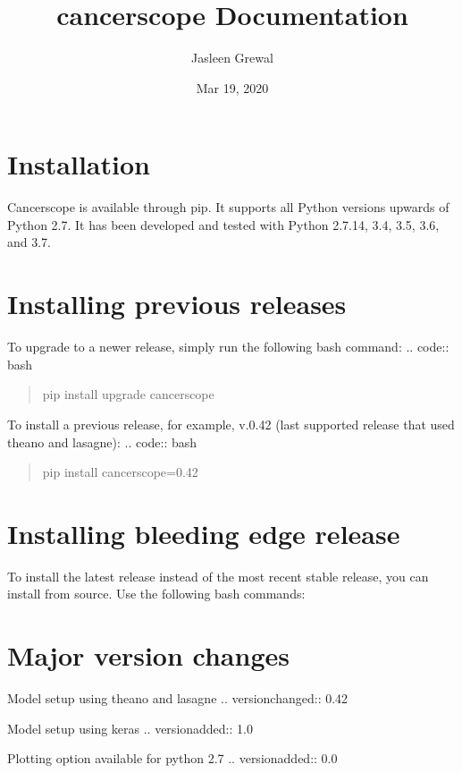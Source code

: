 \documentclass[letterpaper,10pt,english]{sphinxmanual}
\title{cancerscope Documentation}
\date{Mar 19, 2020}
\author{Jasleen Grewal}
\begin{document}
\pagestyle{empty}
\sphinxmaketitle
\pagestyle{plain}
\sphinxtableofcontents
\pagestyle{normal}
\label{\detokenize{index::doc}}



\chapter{Installation}
\label{\detokenize{installation:installation}}\label{\detokenize{installation::doc}}
Cancerscope is available through pip. It supports all Python versions upwards of Python 2.7. It has been developed and tested with Python 2.7.14, 3.4, 3.5, 3.6, and 3.7.


\chapter{Installing previous releases}
\label{\detokenize{installation:installing-previous-releases}}
To upgrade to a newer release, simply run the following bash command:
.. code:: bash
\begin{quote}

pip install \textendash{}upgrade cancerscope
\end{quote}

To install a previous release, for example, v.0.42 (last supported release that used theano and lasagne):
.. code:: bash
\begin{quote}

pip install cancerscope=0.42
\end{quote}


\chapter{Installing bleeding edge release}
\label{\detokenize{installation:installing-bleeding-edge-release}}
To install the latest release instead of the most recent stable release, you can install from source. Use the following bash commands:


\chapter{Major version changes}
\label{\detokenize{installation:major-version-changes}}
Model setup using theano and lasagne
.. versionchanged:: 0.42

Model setup using keras
.. versionadded:: 1.0

Plotting option available for python 2.7
.. versionadded:: 0.0
\end{document}
